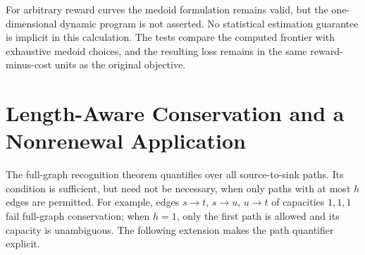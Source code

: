 \documentclass[11pt,letterpaper]{article}
\theoremstyle{definition}\newtheorem{remark}[theorem]{Remark}
\begin{document}
For arbitrary reward curves the medoid formulation remains valid, but the one-dimensional dynamic program is not asserted. No statistical estimation guarantee is implicit in this calculation. The tests compare the computed frontier with exhaustive medoid choices, and the resulting loss remains in the same reward-minus-cost units as the original objective.
\section{Length-Aware Conservation and a Nonrenewal Application}\label{sec:bounded60}
The full-graph recognition theorem quantifies over all source-to-sink paths. Its condition is sufficient, but need not be necessary, when only paths with at most $h$ edges are permitted. For example, edges $s\to t$, $s\to u$, $u\to t$ of capacities $1,1,1$ fail full-graph conservation; when $h=1$, only the first path is allowed and its capacity is unambiguous. The following extension makes the path quantifier explicit.
\end{document}

